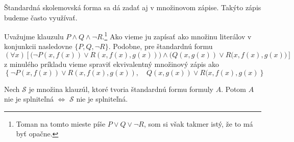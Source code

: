 \begin{poznamka}
    Štandardná skolemovská forma sa dá zadať aj v množinovom zápise.
    Takýto zápis budeme často využívať.
\end{poznamka}

\begin{priklad}
    Uvažujme klauzulu $P \land Q \land \neg R$.\footnote{
    Toman na tomto mieste píše $P \lor Q \lor \neg R$, som si však
    takmer istý, že to má byť opačne.
    }
    Ako vieme ju zapísať ako
    množinu literálov v konjunkcii nasledovne
    $\{P, Q, \neg R\}$.
    Podobne, pre štandardnú formu
    \begin{equation*}
        (\forall x) \left[
            \Big(\neg P(x,f(x)) \lor R(x,f(x),g(x)) \Big) \land
            \Big( Q(x,g(x))\lor R(x,f(x),g(x) \Big) \right]
    \end{equation*}
    z minulého príkladu vieme spraviť ekvivalentný množinový zápis ako
    \begin{equation*}
        \left\{
            \neg P(x,f(x)) \lor R(x,f(x),g(x)), \quad
            Q(x,g(x))\lor R(x,f(x),g(x) 
        \right\}
    \end{equation*}
\end{priklad}

\begin{veta}
    Nech $\mathscr{S}$ je množina klauzúl, ktoré tvoria štandardnú
    formu formuly $A$. Potom $A$ nie je splniteľná $\iff$ $\mathscr{S}$
    nie je splniteľná.
\end{veta}

